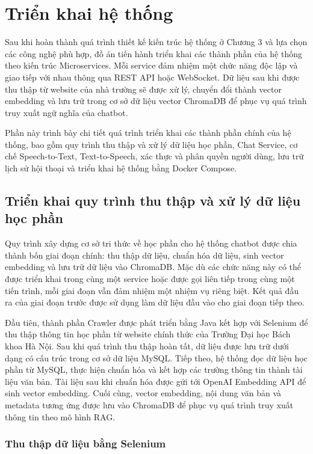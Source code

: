 \documentclass[../DoAn.tex]{subfiles}
\begin{document}
\section{Triển khai hệ thống}
Sau khi hoàn thành quá trình thiết kế kiến trúc hệ thống ở Chương 3 và lựa chọn các công nghệ phù hợp, đồ án tiến hành triển khai các thành phần của hệ thống theo kiến trúc Microservices. Mỗi service đảm nhiệm một chức năng độc lập và giao tiếp với nhau thông qua REST API hoặc WebSocket. Dữ liệu sau khi được thu thập từ website của nhà trường sẽ được xử lý, chuyển đổi thành vector embedding và lưu trữ trong cơ sở dữ liệu vector ChromaDB để phục vụ quá trình truy xuất ngữ nghĩa của chatbot.

Phần này trình bày chi tiết quá trình triển khai các thành phần chính của hệ thống, bao gồm quy trình thu thập và xử lý dữ liệu học phần, Chat Service, cơ chế Speech-to-Text, Text-to-Speech, xác thực và phân quyền người dùng, lưu trữ lịch sử hội thoại và triển khai hệ thống bằng Docker Compose.

\subsection{Triển khai quy trình thu thập và xử lý dữ liệu học phần}

Quy trình xây dựng cơ sở tri thức về học phần cho hệ thống chatbot được chia thành bốn giai đoạn chính: thu thập dữ liệu, chuẩn hóa dữ liệu, sinh vector embedding và lưu trữ dữ liệu vào ChromaDB. Mặc dù các chức năng này có thể được triển khai trong cùng một service hoặc được gọi liên tiếp trong cùng một tiến trình, mỗi giai đoạn vẫn đảm nhiệm một nhiệm vụ riêng biệt. Kết quả đầu ra của giai đoạn trước được sử dụng làm dữ liệu đầu vào cho giai đoạn tiếp theo.

Đầu tiên, thành phần Crawler được phát triển bằng Java kết hợp với Selenium để thu thập thông tin học phần từ website chính thức của Trường Đại học Bách khoa Hà Nội. Sau khi quá trình thu thập hoàn tất, dữ liệu được lưu trữ dưới dạng có cấu trúc trong cơ sở dữ liệu MySQL. Tiếp theo, hệ thống đọc dữ liệu học phần từ MySQL, thực hiện chuẩn hóa và kết hợp các trường thông tin thành tài liệu văn bản. Tài liệu sau khi chuẩn hóa được gửi tới OpenAI Embedding API để sinh vector embedding. Cuối cùng, vector embedding, nội dung văn bản và metadata tương ứng được lưu vào ChromaDB để phục vụ quá trình truy xuất thông tin theo mô hình RAG.

\subsubsection{Thu thập dữ liệu bằng Selenium}
\end{document}
